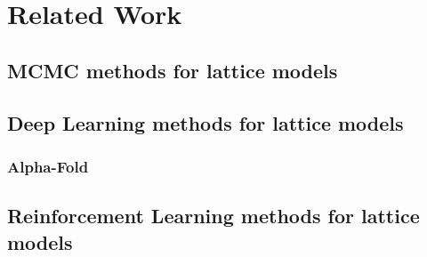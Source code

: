 \section{Related Work}
\subsection{MCMC methods for lattice models}
\subsection{Deep Learning methods for lattice models}
\subsubsection{Alpha-Fold}
\subsection{Reinforcement Learning methods for lattice models}